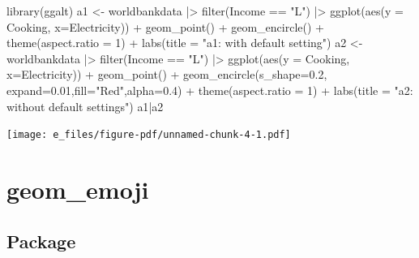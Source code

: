 \documentclass[
  letterpaper,
  DIV=11,
  numbers=noendperiod]{scrreprt}
\newenvironment{Shaded}{\begin{snugshade}}{\end{snugshade}}
\newcommand{\AttributeTok}[1]{\textcolor[rgb]{0.40,0.45,0.13}{#1}}
\newcommand{\DecValTok}[1]{\textcolor[rgb]{0.68,0.00,0.00}{#1}}
\newcommand{\FloatTok}[1]{\textcolor[rgb]{0.68,0.00,0.00}{#1}}
\newcommand{\FunctionTok}[1]{\textcolor[rgb]{0.28,0.35,0.67}{#1}}
\newcommand{\NormalTok}[1]{\textcolor[rgb]{0.00,0.23,0.31}{#1}}
\newcommand{\OtherTok}[1]{\textcolor[rgb]{0.00,0.23,0.31}{#1}}
\newcommand{\SpecialCharTok}[1]{\textcolor[rgb]{0.37,0.37,0.37}{#1}}
\newcommand{\StringTok}[1]{\textcolor[rgb]{0.13,0.47,0.30}{#1}}
\begin{document}
\begin{Shaded}
\begin{Highlighting}[]
\FunctionTok{library}\NormalTok{(ggalt)}
\NormalTok{a1 }\OtherTok{\textless{}{-}}\NormalTok{ worldbankdata }\SpecialCharTok{|\textgreater{}}
  \FunctionTok{filter}\NormalTok{(Income }\SpecialCharTok{==} \StringTok{"L"}\NormalTok{) }\SpecialCharTok{|\textgreater{}}
\FunctionTok{ggplot}\NormalTok{(}\FunctionTok{aes}\NormalTok{(}\AttributeTok{y =}\NormalTok{ Cooking, }\AttributeTok{x=}\NormalTok{Electricity)) }\SpecialCharTok{+} 
  \FunctionTok{geom\_point}\NormalTok{() }\SpecialCharTok{+} 
  \FunctionTok{geom\_encircle}\NormalTok{() }\SpecialCharTok{+} 
  \FunctionTok{theme}\NormalTok{(}\AttributeTok{aspect.ratio =} \DecValTok{1}\NormalTok{) }\SpecialCharTok{+} 
  \FunctionTok{labs}\NormalTok{(}\AttributeTok{title =} \StringTok{"a1: with default setting"}\NormalTok{)}
\NormalTok{a2 }\OtherTok{\textless{}{-}}\NormalTok{ worldbankdata }\SpecialCharTok{|\textgreater{}}
  \FunctionTok{filter}\NormalTok{(Income }\SpecialCharTok{==} \StringTok{"L"}\NormalTok{) }\SpecialCharTok{|\textgreater{}}
\FunctionTok{ggplot}\NormalTok{(}\FunctionTok{aes}\NormalTok{(}\AttributeTok{y =}\NormalTok{ Cooking, }\AttributeTok{x=}\NormalTok{Electricity)) }\SpecialCharTok{+} 
  \FunctionTok{geom\_point}\NormalTok{() }\SpecialCharTok{+} 
  \FunctionTok{geom\_encircle}\NormalTok{(}\AttributeTok{s\_shape=}\FloatTok{0.2}\NormalTok{, }\AttributeTok{expand=}\FloatTok{0.01}\NormalTok{,}\AttributeTok{fill=}\StringTok{"Red"}\NormalTok{,}\AttributeTok{alpha=}\FloatTok{0.4}\NormalTok{) }\SpecialCharTok{+} 
  \FunctionTok{theme}\NormalTok{(}\AttributeTok{aspect.ratio =} \DecValTok{1}\NormalTok{) }\SpecialCharTok{+} \FunctionTok{labs}\NormalTok{(}\AttributeTok{title =} \StringTok{"a2: without default settings"}\NormalTok{)}
\NormalTok{a1}\SpecialCharTok{|}\NormalTok{a2}
\end{Highlighting}
\end{Shaded}

\texttt{[image: e\_files/figure-pdf/unnamed-chunk-4-1.pdf]}

\section{geom\_emoji}\label{geom_emoji}

\subsection{Package}\label{package-3}
\end{document}
